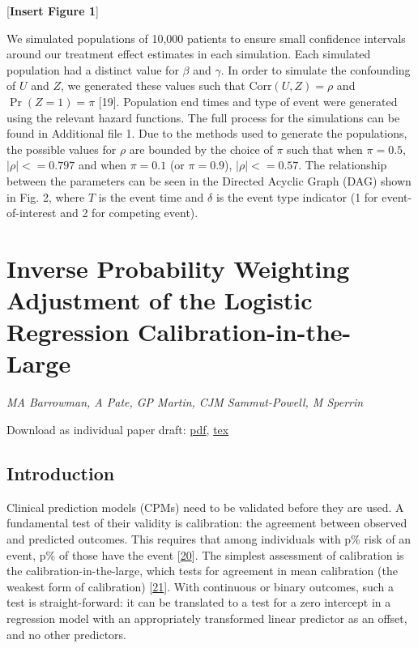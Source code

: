 \documentclass[12pt,PhD,twoside,openright]{muthesis}
\begin{document}
{[}\textbf{Insert Figure 1}{]}

We simulated populations of 10,000 patients to ensure small confidence intervals around our treatment effect estimates in each simulation. Each simulated population had a distinct value for \(\beta\) and \(\gamma\). In order to simulate the confounding of \(U\) and \(Z\), we generated these values such that \(\textrm{Corr}(U,Z) = \rho\) and \(\Pr(Z = 1) = \pi\) {[}19{]}. Population end times and type of event were generated using the relevant hazard functions. The full process for the simulations can be found in Additional file 1. Due to the methods used to generate the populations, the possible values for \(\rho\) are bounded by the choice of \(\pi\) such that when \(\pi = 0.5\), \(\left|\rho\right| <= 0.797\) and when \(\pi = 0.1\) (or \(\pi=0.9\)), \(\left|\rho\right| <= 0.57\). The relationship between the parameters can be seen in the Directed Acyclic Graph (DAG) shown in Fig. 2, where \(T\) is the event time and \(\delta\) is the event type indicator (1 for event-of-interest and 2 for competing event).

\hypertarget{chap-IPCW-logistic}{%
\chapter{Inverse Probability Weighting Adjustment of the Logistic Regression Calibration-in-the-Large}\label{chap-IPCW-logistic}}

\emph{MA Barrowman, A Pate, GP Martin, CJM Sammut-Powell, M Sperrin}

Download as individual paper draft: \href{Chapters/ind_04-IPCW_logistic.pdf}{pdf}, \href{Chapters/ind_04-IPCW_logistic.tex}{tex}

\hypertarget{introduction-3}{%
\section{Introduction}\label{introduction-3}}

Clinical prediction models (CPMs) need to be validated before they are used. A fundamental test of their validity is calibration: the agreement between observed and predicted outcomes. This requires that among individuals with p\% risk of an event, p\% of those have the event {[}\protect\hyperlink{ref-steyerberg_clinical_2008}{20}{]}. The simplest assessment of calibration is the calibration-in-the-large, which tests for agreement in mean calibration (the weakest form of calibration) {[}\protect\hyperlink{ref-calster_calibration_2016-1}{21}{]}. With continuous or binary outcomes, such a test is straight-forward: it can be translated to a test for a zero intercept in a regression model with an appropriately transformed linear predictor as an offset, and no other predictors.
\end{document}
